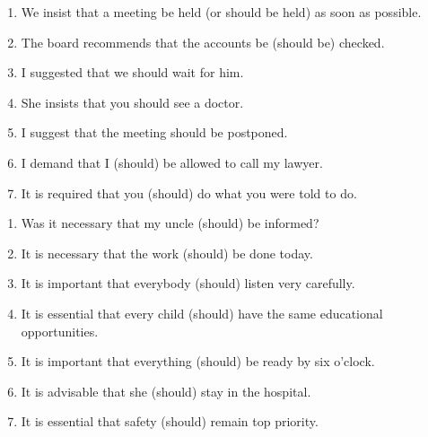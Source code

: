 \begin{enumerate}
      \item We insist that a meeting be held (or should be held) as soon as possible.
      \item The board recommends that the accounts be (should be) checked.
      \item I suggested that we should wait for him.
      \item She insists that you should see a doctor.
      \item I suggest that the meeting should be postponed.
      \item I demand that I (should) be allowed to call my lawyer.
      \item It is required that you (should) do what you were told to do.
\end{enumerate}

\begin{enumerate}
      \item Was it necessary that my uncle (should) be informed?
      \item It is necessary that the work (should) be done today.
      \item It is important that everybody (should) listen very carefully.
      \item It is essential that every child (should) have the same educational opportunities.
      \item It is important that everything (should) be ready by six o'clock.
      \item It is advisable that she (should) stay in the hospital.
      \item It is essential that safety (should) remain top priority.
\end{enumerate}

